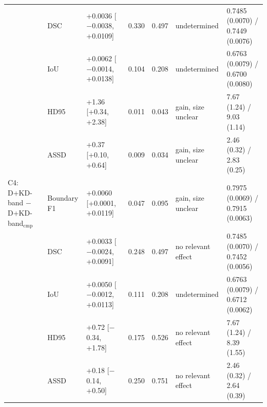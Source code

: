 \begin{tabular}{@{}lllllll@{}}
 & DSC & +0.0036 [$-$0.0038, +0.0109] & 0.330 & 0.497 & undetermined & 0.7485 (0.0070) / 0.7449 (0.0076) \\
 & IoU & +0.0062 [$-$0.0014, +0.0138] & 0.104 & 0.208 & undetermined & 0.6763 (0.0079) / 0.6700 (0.0080) \\
 & HD95 & +1.36 [+0.34, +2.38] & 0.011 & 0.043 & gain, size unclear & 7.67 (1.24) / 9.03 (1.14) \\
 & ASSD & +0.37 [+0.10, +0.64] & 0.009 & 0.034 & gain, size unclear & 2.46 (0.32) / 2.83 (0.25) \\
\midrule
C4: D+KD-band $-$ D+KD-band$_{\mathrm{cmp}}$ & Boundary F1 & +0.0060 [+0.0001, +0.0119] & 0.047 & 0.095 & gain, size unclear & 0.7975 (0.0069) / 0.7915 (0.0063) \\
 & DSC & +0.0033 [$-$0.0024, +0.0091] & 0.248 & 0.497 & no relevant effect & 0.7485 (0.0070) / 0.7452 (0.0056) \\
 & IoU & +0.0050 [$-$0.0012, +0.0113] & 0.111 & 0.208 & undetermined & 0.6763 (0.0079) / 0.6712 (0.0062) \\
 & HD95 & +0.72 [$-$0.34, +1.78] & 0.175 & 0.526 & no relevant effect & 7.67 (1.24) / 8.39 (1.55) \\
 & ASSD & +0.18 [$-$0.14, +0.50] & 0.250 & 0.751 & no relevant effect & 2.46 (0.32) / 2.64 (0.39) \\
\bottomrule
\end{tabular}
